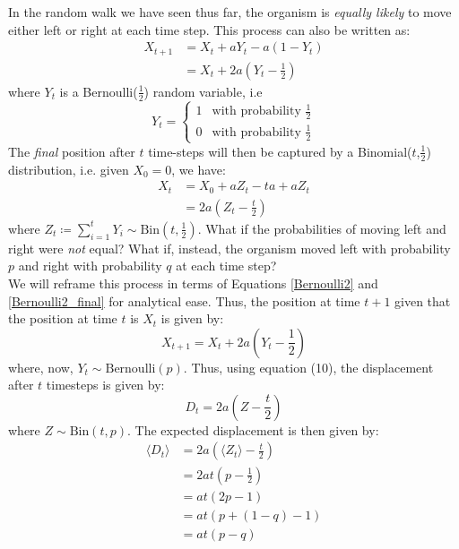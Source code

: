In the random walk we have seen thus far, the organism is \textit{equally likely} to move either left or right at each time step. This process can also be written as:
\begin{align}
	\label{Bernoulli2}
	X_{t+1} &= X_{t} + aY_t - a(1-Y_t)\nonumber\\
	&= X_{t} + 2a(Y_t - \frac{1}{2})
\end{align}
where $Y_t$ is a Bernoulli($\frac{1}{2}$) random variable, i.e 
\begin{equation*}
	Y_t = 
	\begin{cases}
		1 & \textrm{with probability } \frac{1}{2}\\
		0 & \textrm{with probability } \frac{1}{2}
	\end{cases}
\end{equation*}
The \textit{final} position after $t$ time-steps will then be captured by a Binomial($t$,$\frac{1}{2}$) distribution, i.e. given $X_0 = 0$, we have:
\begin{align}
	\label{Bernoulli2_final}
	X_{t} &= X_{0} + aZ_t - ta+aZ_t\nonumber\\
	&=  2a(Z_t - \frac{t}{2})
\end{align}
where $Z_t \coloneqq \sum\limits_{i=1}^{t} Y_i \sim \textrm{Bin}(t,\frac{1}{2})$.
What if the probabilities of moving left and right were \textit{not} equal? What if, instead, the organism moved left with probability $p$ and right with probability $q$ at each time step?\\
We will reframe this process in terms of Equations \eqref{Bernoulli2} and \eqref{Bernoulli2_final} for analytical ease. Thus, the position at time $t+1$ given that the position at time $t$ is $X_t$ is given by:
\begin{equation*}
	X_{t+1} = X_{t} + 2a(Y_t - \frac{1}{2})
\end{equation*}
where, now, $Y_t \sim \textrm{Bernoulli}(p)$. Thus, using equation (10), the displacement after $t$ timesteps is given by:
\begin{equation*}
	D_{t} =  2a(Z - \frac{t}{2})
\end{equation*}
where $Z \sim \textrm{Bin}(t,p)$. The expected displacement is then given by:
\begin{align}
	\label{biased_D}
	\big\langle D_t \big\rangle &= 2a(\big\langle Z_t\big\rangle - \frac{t}{2})\nonumber\\
	&= 2at(p-\frac{1}{2})\nonumber\\
	&= at(2p-1)\nonumber\\
	&= at(p+(1-q)-1)\nonumber\\
	&= at(p-q)
\end{align}

